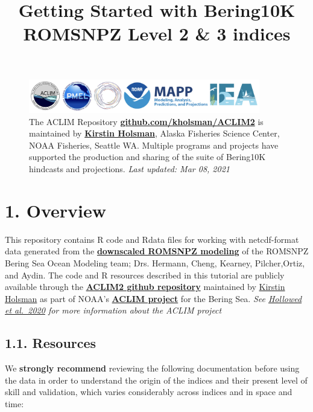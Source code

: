 \documentclass[
]{article}
\title{Getting Started with Bering10K ROMSNPZ Level 2 \& 3 indices}
\author{}
\date{\vspace{-2.5em}}
\begin{document}
\maketitle

{
\setcounter{tocdepth}{2}
\tableofcontents
}
\begin{figure}
\centering
\includegraphics[width=0.9\textwidth,height=\textheight]{Figs/logos2.jpg}
\caption{The ACLIM Repository
\href{https://github.com/kholsman/ACLIM2}{\textbf{github.com/kholsman/ACLIM2}}
is maintained by \textbf{\href{kirstin.holsman@noaa.gov}{Kirstin
Holsman}}, Alaska Fisheries Science Center, NOAA Fisheries, Seattle WA.
Multiple programs and projects have supported the production and sharing
of the suite of Bering10K hindcasts and projections. \emph{Last updated:
Mar 08, 2021}}
\end{figure}

\hypertarget{overview}{%
\section{1. Overview}\label{overview}}

This repository contains R code and Rdata files for working with
netcdf-format data generated from the
\href{https://beringnpz.github.io/roms-bering-sea}{\textbf{downscaled
ROMSNPZ modeling}} of the ROMSNPZ Bering Sea Ocean Modeling team; Drs.
Hermann, Cheng, Kearney, Pilcher,Ortiz, and Aydin. The code and R
resources described in this tutorial are publicly available through the
\href{https://github.com/kholsman/ACLIM2}{\textbf{ACLIM2 github
repository}} maintained by \href{kirstin.holsman@noaa.gov}{Kirstin
Holsman} as part of NOAA's
\href{https://www.fisheries.noaa.gov/alaska/ecosystems/alaska-climate-integrated-modeling-project}{\textbf{ACLIM
project}} for the Bering Sea. \emph{See
\href{https://www.frontiersin.org/articles/10.3389/fmars.2019.00775/full}{Hollowed
et al.~2020} for more information about the ACLIM project}

\hypertarget{resources}{%
\subsection{1.1. Resources}\label{resources}}

We \textbf{strongly recommend} reviewing the following documentation
before using the data in order to understand the origin of the indices
and their present level of skill and validation, which varies
considerably across indices and in space and time:
\end{document}
